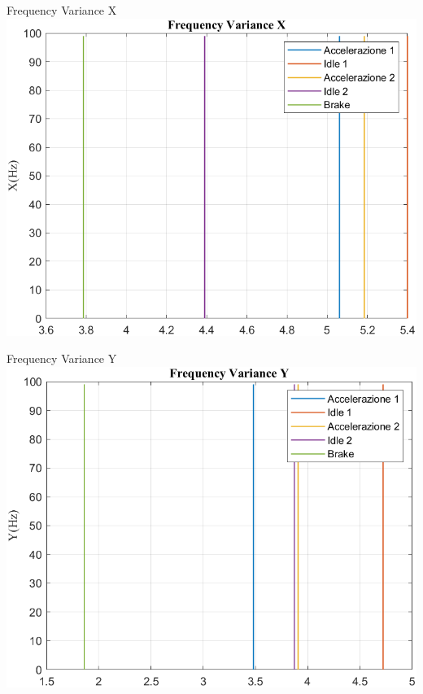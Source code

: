 \documentclass[beamer]{standalone}
\begin{document}
	\begin{frame}{{Frequency Variance X}}
		\centering\includegraphics[height=.8\textheight]{figure/Mag/Trasformata/Frequency VarianceX}
	\end{frame}
	
	\begin{frame}{{Frequency Variance Y}}
		\centering\includegraphics[height=.8\textheight]{figure/Mag/Trasformata/Frequency VarianceY}
	\end{frame}
	
\end{document}

